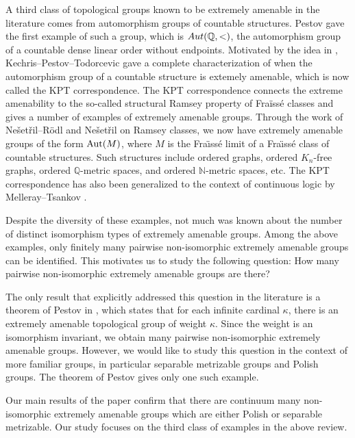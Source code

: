 \documentclass{amsart}
\theoremstyle{definition}
\theoremstyle{remark}
\begin{document}
A third class of topological groups known to be extremely amenable in the literature comes from automorphism groups of countable structures. Pestov \cite{Pestov98} gave the first example of such a group, which is ${\rm Aut}(\mathbb{Q}, <)$, the automorphism group of a countable dense linear order without endpoints. Motivated by the idea in \cite{Pestov98}, Kechris--Pestov--Todorcevic \cite{KPT} gave a complete characterization of when the automorphism group of a countable structure is extemely amenable, which is now called the KPT correspondence. The KPT correspondence connects the extreme amenability to the so-called structural Ramsey property of Fra\"iss\'e classes and gives a number of examples of extremely amenable groups.  Through the work of Ne\v{s}et\v{r}il--R\"{o}dl \cite{NR77} \cite{NR83} and Ne\v{s}et\v{r}il \cite{Nes07} on Ramsey classes, we now have extremely amenable groups of the form $\mbox{\rm Aut}(M)$, where $M$ is the Fra\"{\i}ss\'{e} limit of a Fra\"{\i}ss\'{e} class of countable structures. Such structures include ordered graphs, ordered $K_n$-free graphs, ordered $\mathbb{Q}$-metric spaces, and ordered $\mathbb{N}$-metric spaces, etc. The KPT correspondence has also been generalized to the context of continuous logic by Melleray--Tsankov \cite{MT}.

Despite the diversity of these examples, not much was known about the number of distinct isomorphism types of extremely amenable groups. Among the above examples, only finitely many pairwise non-isomorphic extremely amenable groups can be identified. This motivates us to study the following question: How many pairwise non-isomorphic extremely amenable groups are there? 

The only result that explicitly addressed this question in the literature is a theorem of Pestov in \cite{Pestov98}, which states that for each infinite cardinal $\kappa$, there is an extremely amenable topological group of weight $\kappa$. Since the weight is an isomorphism invariant, we obtain many pairwise non-isomorphic extremely amenable groups. However, we would like to study this question in the context of more familiar groups, in particular separable metrizable groups and Polish groups. The theorem of Pestov gives only one such example. 

Our main results of the paper confirm that there are continuum many non-isomorphic extremely amenable groups which are either Polish or separable metrizable. Our study focuses on the third class of examples in the above review. 
\end{document}
